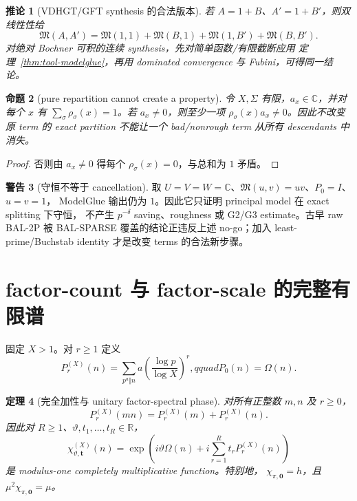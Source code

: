 \documentclass[11pt,a4paper]{ctexart}
\newtheorem{theorem}{定理}[section]
\newtheorem{corollary}[theorem]{推论}
\newtheorem{proposition}[theorem]{命题}
\theoremstyle{definition}
\newtheorem{warning}[theorem]{警告}
\newcommand{\C}{\mathbb C}
\newcommand{\1}{\mathbf 1}
\begin{document}
\begin{corollary}[VDHGT/GFT synthesis 的合法版本]
若 $A=1+B$、$A'=1+B'$，则双线性性给
\[
\mathfrak M(A,A')=\mathfrak M(1,1)+\mathfrak M(B,1)
+\mathfrak M(1,B')+\mathfrak M(B,B').                 \tag{18.2}
\]
对绝对 Bochner 可积的连续 synthesis，先对简单函数/有限截断应用
定理~\ref{thm:tool-modelglue}，再用 dominated convergence 与 Fubini，可得同一结论。
\end{corollary}

\begin{proposition}[pure repartition cannot create a property]
令 $X,\Sigma$ 有限，$a_x\in\C$，并对每个 $x$ 有
$\sum_\sigma\rho_\sigma(x)=1$。若 $a_x\ne0$，则至少一项
$\rho_\sigma(x)a_x\ne0$。因此不改变原 term 的 exact partition 不能让一个
bad/nonrough term 从所有 descendants 中消失。
\end{proposition}

\begin{proof}
否则由 $a_x\ne0$ 得每个 $\rho_\sigma(x)=0$，与总和为 $1$ 矛盾。
\end{proof}

\begin{warning}[守恒不等于 cancellation]
取 $U=V=W=\C$、$\mathfrak M(u,v)=uv$、$P_0=I$、$u=v=1$，
ModelGlue 输出仍为 $1$。因此它只证明 principal model 在 exact splitting 下守恒，
不产生 $p^{-\delta}$ saving、roughness 或 G2/G3 estimate。古早 raw BAL-2P
被 BAL-SPARSE 覆盖的结论正违反上述 no-go；加入 least-prime/Buchstab identity
才是改变 terms 的合法新步骤。
\end{warning}

\section{factor-count 与 factor-scale 的完整有限谱}

固定 $X>1$。对 $r\ge1$ 定义
\[
P_r^{(X)}(n)=\sum_{p^a\Vert n}a
\left(\frac{\log p}{\log X}\right)^r,qquad
P_0(n)=\Omega(n).                                     \tag{19.1}
\]

\begin{theorem}[完全加性与 unitary factor-spectral phase]\label{thm:tool-gfst}
对所有正整数 $m,n$ 及 $r\ge0$，
\[
P_r^{(X)}(mn)=P_r^{(X)}(m)+P_r^{(X)}(n).              \tag{19.2}
\]
因此对 $R\ge1$、$\vartheta,t_1,\ldots,t_R\in\mathbb R$，
\[
\chi_{\vartheta,\mathbf t}^{(X)}(n)
=\exp\!\left(i\vartheta\Omega(n)+i\sum_{r=1}^Rt_rP_r^{(X)}(n)\right)
\tag{19.3}
\]
是 modulus-one completely multiplicative function。特别地，
$\chi_{\pi,\mathbf0}=h$，且 $\mu^2\chi_{\pi,\mathbf0}=\mu$。
\end{theorem}
\end{document}
